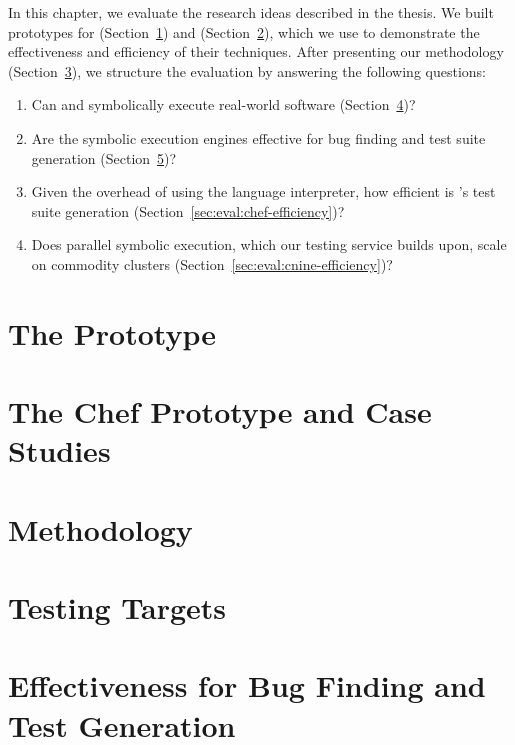 In this chapter, we evaluate the research ideas described in the thesis.
%
We built prototypes for \cnine (Section~\ref{sec:eval:cnine-proto}) and \chef (Section~\ref{sec:eval:chef-proto}), which we use to demonstrate the effectiveness and efficiency of their techniques.
%
After presenting our methodology (Section~\ref{sec:eval:methodology}), we structure the evaluation by answering the following questions:
\begin{enumerate}
\item Can \chef and \cnine symbolically execute real-world software (Section~\ref{sec:eval:targets})?
\item Are the symbolic execution engines effective for bug finding and test suite generation (Section~\ref{sec:eval:bug-finding})?
\item Given the overhead of using the language interpreter, how efficient is \chef's test suite generation (Section~\ref{sec:eval:chef-efficiency})?
\item Does parallel symbolic execution, which our testing service builds upon, scale on commodity clusters (Section~\ref{sec:eval:cnine-efficiency})?
\end{enumerate}

\section{The \cnine Prototype}
\label{sec:eval:cnine-proto}


\section{The Chef Prototype and Case Studies}
\label{sec:eval:chef-proto}


\section{Methodology}
\label{sec:eval:methodology}


\section{Testing Targets}
\label{sec:eval:targets}


\section{Effectiveness for Bug Finding and Test Generation}
\label{sec:eval:bug-finding}


